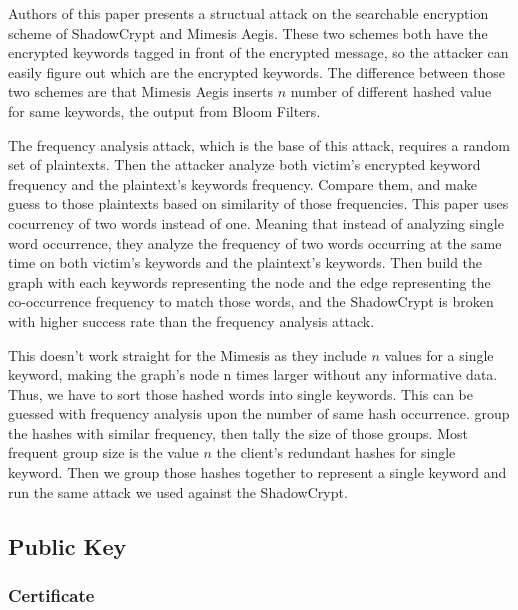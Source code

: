 \documentclass[a4paper]{article}
\begin{document}
Authors of this paper presents a structual attack on the searchable encryption scheme of ShadowCrypt and Mimesis Aegis. These two schemes both have the encrypted keywords tagged in front of the encrypted message, so the attacker can easily figure out which are the encrypted keywords. The difference between those two schemes are that Mimesis Aegis inserts $n$ number of different hashed value for same keywords, the output from Bloom Filters. 
\par The frequency analysis attack, which is the base of this attack, requires a random set of plaintexts. Then the attacker analyze both victim's encrypted keyword frequency and the plaintext's keywords frequency. Compare them, and make guess to those plaintexts based on similarity of those frequencies. This paper uses cocurrency of two words instead of one. Meaning that instead of analyzing single word occurrence, they analyze the frequency of two words occurring at the same time on both victim's keywords and the plaintext's keywords. Then build the graph with each keywords representing the node and the edge representing the co-occurrence frequency to match those words, and the ShadowCrypt is broken with higher success rate than the frequency analysis attack.
\par This doesn't work straight for the Mimesis as they include $n$ values for a single keyword, making the graph's node n times larger without any informative data. Thus, we have to sort those hashed words into single keywords. This can be guessed with frequency analysis upon the number of same hash occurrence. group the hashes with similar frequency, then tally the size of those groups. Most frequent group size is the value $n$ the client's redundant hashes for single keyword. Then we group those hashes together to represent a single keyword and run the same attack we used against the ShadowCrypt.



\subsection{Public Key}

\subsubsection{Certificate}
\end{document}
